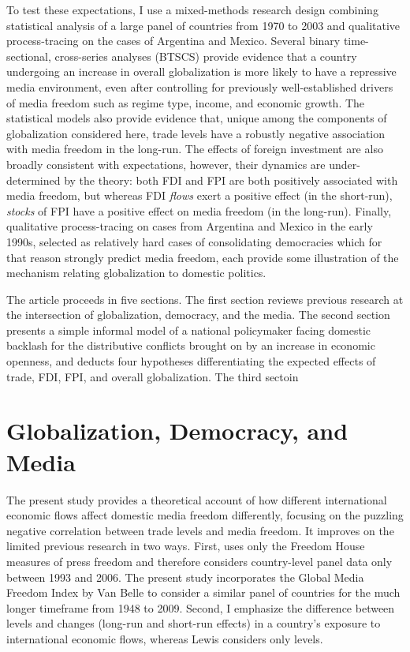 \documentclass[12pt,a4paper]{article}\usepackage[]{graphicx}\usepackage[]{color}
\begin{document}
To test these expectations, I use a mixed-methods research design combining statistical analysis of a large panel of countries from 1970 to 2003 and qualitative process-tracing on the cases of Argentina and Mexico. Several binary time-sectional, cross-series analyses (BTSCS) provide evidence that a country undergoing an increase in overall globalization is more likely to have a repressive media environment, even after controlling for previously well-established drivers of media freedom such as regime type, income, and economic growth. The statistical models also provide evidence that, unique among the components of globalization considered here, trade levels have a robustly negative association with media freedom in the long-run. The effects of foreign investment are also broadly consistent with expectations, however, their dynamics are under-determined by the theory: both FDI and FPI are both positively associated with media freedom, but whereas FDI \emph{flows} exert a positive effect (in the short-run), \emph{stocks} of FPI have a positive effect on media freedom (in the long-run). Finally, qualitative process-tracing on cases from Argentina and Mexico in the early 1990s, selected as relatively hard cases of consolidating democracies which for that reason strongly predict media freedom, each provide some illustration of the mechanism relating globalization to domestic politics.

The article proceeds in five sections. The first section reviews previous research at the intersection of globalization, democracy, and the media. The second section presents a simple informal model of a national policymaker facing domestic backlash for the distributive conflicts brought on by an increase in economic openness, and deducts four hypotheses differentiating the expected effects of trade, FDI, FPI, and overall globalization. The third sectoin

\section{Globalization, Democracy, and Media}

The present study provides a theoretical account of how different international economic flows affect domestic media freedom differently, focusing on the puzzling negative correlation between trade levels and media freedom. It improves on the limited previous research in two ways. First, \parencite*{Lewis:qDvYbWlU} uses only the Freedom House measures of press freedom and therefore considers country-level panel data only between 1993 and 2006. The present study incorporates the Global Media Freedom Index by Van Belle \parencites{Belle:1997wo}{van2000press} to consider a similar panel of countries for the much longer timeframe from 1948 to 2009. Second, I emphasize the difference between levels and changes (long-run and short-run effects) in a country's exposure to international economic flows, whereas Lewis considers only levels.
\end{document}
